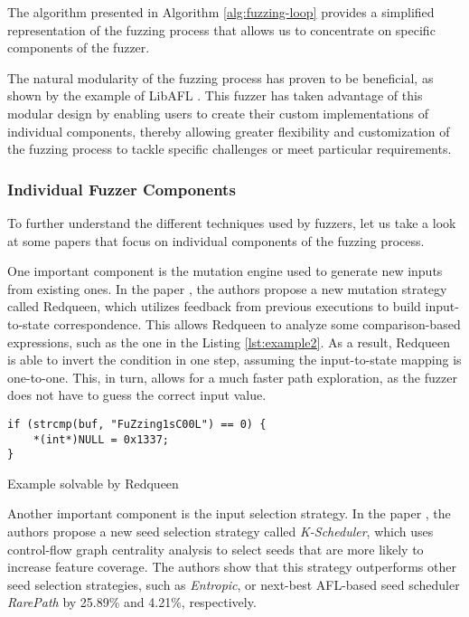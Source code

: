 The algorithm presented in Algorithm \ref{alg:fuzzing-loop} provides a simplified representation of the fuzzing process that allows us to concentrate on specific components of the fuzzer.

The natural modularity of the fuzzing process has proven to be beneficial, as shown by the example of LibAFL \cite{libafl-ccs21}. This fuzzer has taken advantage of this modular design by enabling users to create their custom implementations of individual components, thereby allowing greater flexibility and customization of the fuzzing process to tackle specific challenges or meet particular requirements.

\subsubsection{Individual Fuzzer Components}

To further understand the different techniques used by fuzzers, let us take a look at some papers that focus on individual components of the fuzzing process.

One important component is the mutation engine used to generate new inputs from existing ones. In the paper \cite{redqueen-ndss19}, the authors propose a new mutation strategy called Redqueen, which utilizes feedback from previous executions to build input-to-state correspondence. This allows Redqueen to analyze some comparison-based expressions, such as the one in the Listing \ref{lst:example2}. As a result, Redqueen is able to invert the condition in one step, assuming the input-to-state mapping is one-to-one. This, in turn, allows for a much faster path exploration, as the fuzzer does not have to guess the correct input value.

\begin{listing}[htp]
	\centering
	\begin{minipage}{.6\linewidth}
		\begin{verbatim}
if (strcmp(buf, "FuZzing1sC00L") == 0) {
	*(int*)NULL = 0x1337;
}
		\end{verbatim}
	\end{minipage}
	\caption{Example solvable by Redqueen}
	\label{lst:example2}
\end{listing}

Another important component is the input selection strategy. In the paper \cite{effective-seed-scheduling-for-fuzzing-with-graph-centrality-analysis}, the authors propose a new seed selection strategy called \textit{K-Scheduler}, which uses control-flow graph centrality analysis to select seeds that are more likely to increase feature coverage. The authors show that this strategy outperforms other seed selection strategies, such as \textit{Entropic}, or next-best AFL-based seed scheduler \textit{RarePath} by 25.89\% and 4.21\%, respectively.

